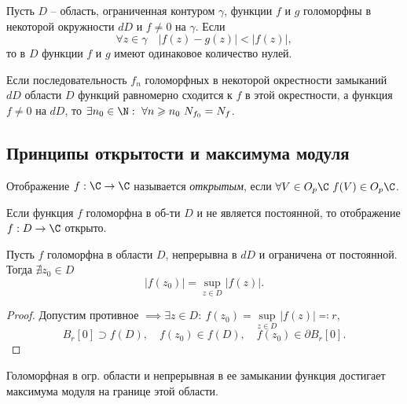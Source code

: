 \begin{theorem}
	Пусть $D$ -- область, ограниченная контуром $\gamma $, функции $f$ и $g$ голоморфны в некоторой окружности $dD$ и $f \ne 0$ на $\gamma $. Если
	\[
		\forall z \in \gamma \quad \big|f(z) - g(z)\big| < \big|f(z)\big|,
	\]
	то в $D$ функции $f$ и $g$ имеют одинаковое количество нулей.
\end{theorem}

\begin{corollary}
	Если последовательность $f_n$ голоморфных в некоторой окрестности замыканий $dD$ области $D$ функций равномерно сходится к $f$ в этой окрестности, а функция $f \ne 0$ на $dD$, то $\exists n_0 \in \N: \ \forall n \geqslant n_0 \ N_{f_0} = N_f$.
\end{corollary}

\subsection{Принципы открытости и максимума модуля}

\begin{definition}
	Отображение $f:\C \rightarrow \C$ называется \emph{открытым}, если $\forall V \in O_p \C \ f(V) \in O_p \C$.
\end{definition}

\begin{theorem}
	Если функция $f$ голоморфна в об-ти $D$ и не является постоянной, то отображение $f : D \rightarrow \C$ открыто.
\end{theorem}

\begin{theorem}
	Пусть $f$ голоморфна в области $D$, непрерывна в $dD$ и ограничена от постоянной. Тогда $\nexists z_0 \in D$
	\[
		\big|f(z_0)\big| = \underset{z \in D}{\sup} \big|f(z)\big|.
	\]
\end{theorem}

\begin{proof}
	Допустим противное $\implies \exists z \in D: \ f(z_0) = \underset{z\in D}{\sup} \big|f(z)\big| \eqcolon r$,
	\[
		B_r [0] \supset f(D), \quad f(z_0) \in f(D), \quad f(z_0)\in \partial B_r[0].
	\]
\end{proof}

\begin{corollary}
	Голоморфная в огр. области и непрерывная в ее замыкании функция достигает максимума модуля на границе этой области.
\end{corollary}

